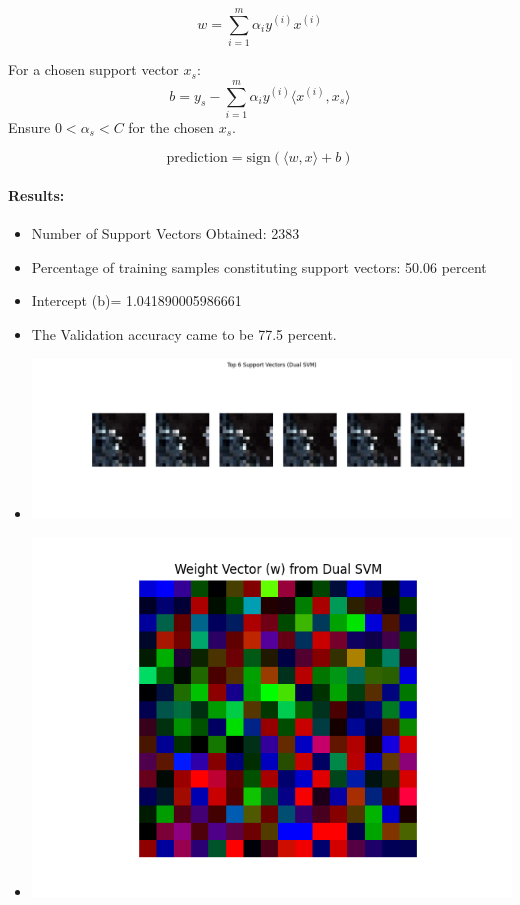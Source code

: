 \documentclass[12pt,a4paper]{article}
\begin{document}
\[ w = \sum_{i=1}^{m} \alpha_i y^{(i)} x^{(i)} \]


For a chosen support vector \( x_s \): \\
\[ b = y_s - \sum_{i=1}^{m} \alpha_i y^{(i)} \langle x^{(i)}, x_s \rangle \]
Ensure \( 0 < \alpha_s < C \) for the chosen \( x_s \).

\[ \text{prediction} = \text{sign}(\langle w, x \rangle + b) \]

\paragraph{Results:}
\begin{itemize}
    \item Number of Support Vectors Obtained: 2383
    \item Percentage of training samples constituting support vectors: 50.06 percent
    \item Intercept (b)= 1.041890005986661
    \item The Validation accuracy came to be 77.5 percent.
    \item \includegraphics[width=\textwidth]{Assignment 2/q2/top_6_support_vectors_dual cvxopt linear.png}
    \item \includegraphics[width=\textwidth]{Assignment 2/q2/weight_vector_dual cvxopt linear.png}
\end{itemize}
\end{document}
